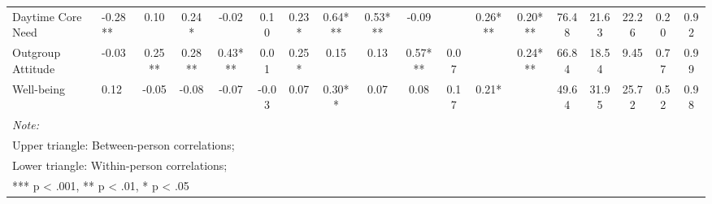 \begin{sidewaystable}
{\begin{tabular}[t]{llcccccccccccccccc}
Daytime Core Need & -0.28** & 0.10 & 0.24* & -0.02 & 0.10 & 0.23* & 0.64*** & 0.53*** & -0.09 &  & 0.26*** & 0.20*** & 76.48 & 21.63 & 22.26 & 0.20 & 0.92\\
\addlinespace
Outgroup Attitude & -0.03 & 0.25** & 0.28** & 0.43*** & 0.01 & 0.25* & 0.15 & 0.13 & 0.57*** & 0.07 &  & 0.24*** & 66.84 & 18.54 & 9.45 & 0.77 & 0.99\\
Well-being & 0.12 & -0.05 & -0.08 & -0.07 & -0.03 & 0.07 & 0.30** & 0.07 & 0.08 & 0.17 & 0.21* &  & 49.64 & 31.95 & 25.72 & 0.52 & 0.98\\
\bottomrule
\multicolumn{18}{l}{\rule{0pt}{1em}\textit{Note: }}\\
\multicolumn{18}{l}{\rule{0pt}{1em}Upper triangle: Between-person correlations;}\\
\multicolumn{18}{l}{\rule{0pt}{1em}Lower triangle: Within-person correlations;}\\
\multicolumn{18}{l}{\rule{0pt}{1em}*** p < .001, ** p < .01,  * p < .05}\\
\end{tabular}}
\end{sidewaystable}
